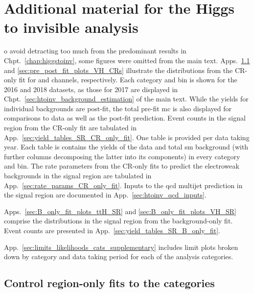\chapter{Additional material for the Higgs to invisible analysis}
\label{app:supplementary_hinv_plots}

o avoid detracting too much from the predominant results in Chpt.~\ref{chap:higgstoinv}, some figures were omitted from the main text. Apps.~\ref{sec:pre_post_fit_plots_ttH_CRs} and \ref{sec:pre_post_fit_plots_VH_CRs} illustrate the distributions from the \gls{CR}-only fit for \ttH and \VH channels, respectively. Each category and \ptmiss bin is shown for the 2016 and 2018 datasets, as those for 2017 are displayed in Chpt.~\ref{sec:htoinv_background_estimation} of the main text. While the yields for individual backgrounds are post-fit, the total pre-fit \acrshort{mc} is also displayed for comparisons to data as well as the post-fit prediction. Event counts in the signal region from the \gls{CR}-only fit are tabulated in App.~\ref{sec:yield_tables_SR_CR_only_fit}. One table is provided per data taking year. Each table is contains the yields of the data and total \acrshort{sm} background (with further columns decomposing the latter into its components) in every category and \ptmiss bin. The rate parameters from the \gls{CR}-only fits to predict the electroweak backgrounds in the signal region are tabulated in App.~\ref{sec:rate_params_CR_only_fit}. Inputs to the \acrshort{qcd} multijet prediction in the signal region are documented in App.~\ref{sec:htoinv_qcd_inputs}.

Apps.~\ref{sec:B_only_fit_plots_ttH_SR} and \ref{sec:B_only_fit_plots_VH_SR} comprise the distributions in the signal region from the background-only fit. Event counts are presented in App.~\ref{sec:yield_tables_SR_B_only_fit}.

App.~\ref{sec:limits_likelihoods_cats_supplementary} includes limit plots broken down by category and data taking period for each of the analysis categories.




\section{Control region-only fits to the \texorpdfstring{\ttH}{ttH} categories}
\label{sec:pre_post_fit_plots_ttH_CRs}


